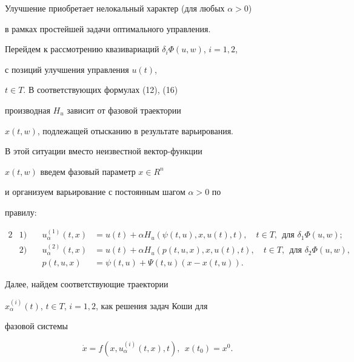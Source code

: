 Улучшение приобретает нелокальный характер (для любых $\alpha>0$)


в рамках простейшей задачи оптимального управления.





Перейдем к рассмотрению квазивариаций $\delta_{i}\Phi(u,w)$, $i=1,2$,


с позиций улучшения управления $u(t)$,


$t\in T$. В соответствующих формулах (12), (16) 


производная $H_{u}$ зависит от фазовой траектории


$x(t,w)$, подлежащей отысканию в результате варьирования. 


В этой ситуации вместо неизвестной вектор-функции


$x(t,w)$ введем фазовый параметр $ x\in R^{n}$


и организуем варьирование с постоянным шагом $\alpha>0$ по


правилу:


\begin{alignat*}{2}


& 1) &\quad


u_{\alpha}^{(1)}(t,x) &=u(t)+\alpha H_{u}(\psi(t,u), x, u(t),t),


\quad t\in T, \ \ \text{для $\delta_{1}\Phi(u,w)$}; \\


%


& 2) &\quad


u_{\alpha}^{(2)}(t,x) &=u(t)+\alpha H_{u}(p(t,u,x), x, u(t),t),


\quad t\in T,\ \ \text{для $\delta_{2}\Phi(u,w)$}, \\


%


&  &\quad p(t,u,x) &=\psi(t,u)+\Psi(t,u)(x - x(t,u)).


\end{alignat*}





Далее, найдем соответствующие траектории


$x_{\alpha}^{(i)}(t)$, $t\in T$, $i=1, 2$, как решения задач Коши для


фазовой системы


\begin{equation}


\Dot{x}=f(x,u_{\alpha}^{(i)}(t,x),t),\ \ x(t_{0})=x^{0}.


\end{equation}


